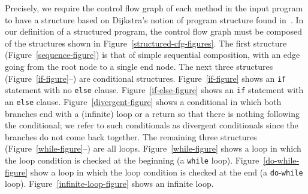 Precisely, we require the control flow graph of each method in the
input program to have a structure based on Dijkstra's notion of
program structure found in~\cite{dijkstra1972}.
In our definition of a structured program, the control flow graph must
be composed of the structures shown in
Figure~\ref{structured-cfg-figures}. 
The first structure (Figure~\ref{sequence-figure}) is that of simple
sequential composition, with an edge going from the root node to a
single end node.
The next three structures
(Figure~\ref{if-figure}--) are conditional
structures. 
Figure~\ref{if-figure} shows an \texttt{if} statement with no
\texttt{else} clause. 
Figure~\ref{if-else-figure} shows an \texttt{if} statement with an
\texttt{else} clause. 
Figure~\ref{divergent-figure} shows a conditional in which both
branches end with a (infinite) loop or a return so that there is
nothing following the conditional; we refer to such conditionals as
divergent conditionals since the branches do not come back together.
The remaining three structures
(Figure~\ref{while-figure}--) are all
loops.
Figure~\ref{while-figure} shows a loop in which the loop condition is
checked at the beginning (a \texttt{while} loop).
Figure~\ref{do-while-figure} show a loop in which the loop condition
is checked at the end (a \texttt{do}-\texttt{while} loop).
Figure~\ref{infinite-loop-figure} shows an infinite loop.

